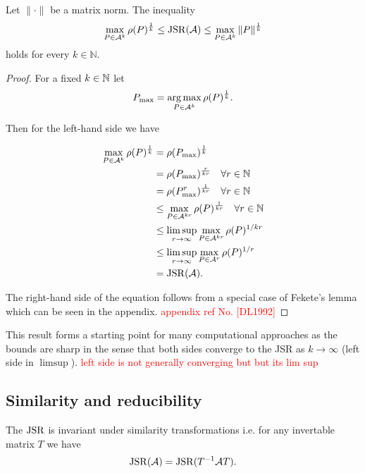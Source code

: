 \begin{proposition}
    Let $\|\cdot\|$ be a matrix norm. The inequality
    \begin{equation}
    \max_{P \in \mathcal{A}^k} \rho(P)^{\frac{1}{k}} \leq \operatorname{JSR}(\mathcal{A}) \leq \max_{P \in \mathcal{A}^k} \| P\|^{\frac{1}{k}}
    \label{eq:three-member}
    \end{equation}
    holds for every $k \in \mathbb{N}$.
\end{proposition}
\begin{proof}
    For a fixed $k \in \mathbb{N}$ let 
    $$
    P_{\text{max}} = \operatorname*{arg\,max}_{P \in \mathcal{A}^k} \rho(P)^{\frac{1}{k}}.
    $$ 

    Then for the left-hand side we have

    \begin{align*}
        \max_{P \in \mathcal{A}^k} \rho(P)^{\frac{1}{k}} & = \rho(P_{\text{max}})^{\frac{1}{k}} \\
        & = \rho(P_{\text{max}})^{\frac{r}{kr}} \quad \forall r \in \mathbb{N} \\
        & = \rho(P_{\text{max}}^{r})^{\frac{1}{kr}} \quad \forall r \in \mathbb{N}\\
        & \leq \max_{P \in \mathcal{A}^{kr}} \rho(P)^{\frac{1}{kr}} \quad \forall r \in \mathbb{N}\\
        & \leq \limsup_{r \to \infty} \max_{P \in \mathcal{A}^{kr}} \rho(P)^{1/kr}\\
        & \leq \limsup_{r \to \infty} \max_{P \in \mathcal{A}^{r}} \rho(P)^{1/r}\\
        & = \operatorname{JSR}(\mathcal{A}).
    \end{align*}

    The right-hand side of the equation follows from a special case of Fekete's lemma which can be seen in the appendix. 
    \textcolor{red}{appendix ref No. [DL1992]} 
\end{proof}
This result forms a starting point for many computational approaches as the bounds are sharp in the sense that both sides converge to the JSR as $k\rightarrow \infty$ (left side in $\limsup$).
\textcolor{red}{left side is not generally converging but but its lim sup}

\subsection*{Similarity and reducibility}

\begin{proposition}
    The $\operatorname{JSR}$ is invariant under similarity transformations i.e. for any invertable matrix $T$ we have
    \begin{equation}
       \operatorname{JSR}(\mathcal{A}) = \operatorname{JSR}(T^{-1}\mathcal{A}T).
    \end{equation}
\end{proposition}

